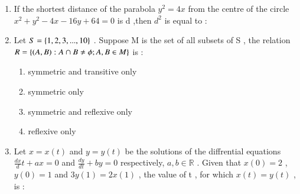 \documentclass[journal,12pt,onecolumn]{IEEEtran}
\theoremstyle{remark}
\begin{document}
\begin{enumerate}
\hfill{}
\begin{enumerate}
\end{enumerate}

\item If the shortest distance of the parabola $ y^2=4x $ from the centre of the circle $ x^2+y^2-4x-16y+64=0 $ is d ,then $ d^2 $ is equal to :

\hfill{}  
\begin{enumerate}   
\end{enumerate}

\item Let $S=\left\{1,2,3,...,10\right\}$  . Suppose M is the set of all subsets of S , the relation  $R=\left\{ (A,B):A \cap B \neq \phi ;A,B \in M \right\}$ is :

\hfill{}
\begin{enumerate}
\item symmetric and transitive only 
\item symmetric only 
\item symmetric and reflexive only 
\item reflexive only 
\end{enumerate}

\item Let $x=x(t)$ and $y=y(t)$ be the solutions of the diffrential equations $\frac{dx}dt{}+ax=0$ and $\frac{dy}{dt}+by=0$ respectively, $a,b \in \mathbb{R}$ . Given that $x(0)=2$ , $y(0)=1$ and $3y(1)=2x(1)$ , the value of t , for which $x(t)=y(t)$ , is :  

\hfill{}
\begin{enumerate}   
\end{enumerate}


\end{enumerate}
\end{document}
